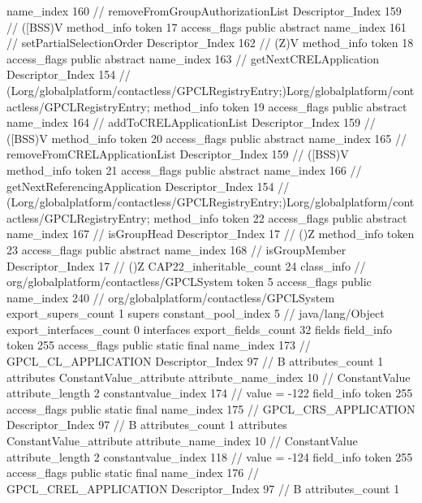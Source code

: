 {{{{{					name_index	160		// removeFromGroupAuthorizationList
					Descriptor_Index	159		// ([BSS)V
				}
				method_info {
					token	17
					access_flags	public abstract
					name_index	161		// setPartialSelectionOrder
					Descriptor_Index	162		// (Z)V
				}
				method_info {
					token	18
					access_flags	public abstract
					name_index	163		// getNextCRELApplication
					Descriptor_Index	154		// (Lorg/globalplatform/contactless/GPCLRegistryEntry;)Lorg/globalplatform/contactless/GPCLRegistryEntry;
				}
				method_info {
					token	19
					access_flags	public abstract
					name_index	164		// addToCRELApplicationList
					Descriptor_Index	159		// ([BSS)V
				}
				method_info {
					token	20
					access_flags	public abstract
					name_index	165		// removeFromCRELApplicationList
					Descriptor_Index	159		// ([BSS)V
				}
				method_info {
					token	21
					access_flags	public abstract
					name_index	166		// getNextReferencingApplication
					Descriptor_Index	154		// (Lorg/globalplatform/contactless/GPCLRegistryEntry;)Lorg/globalplatform/contactless/GPCLRegistryEntry;
				}
				method_info {
					token	22
					access_flags	public abstract
					name_index	167		// isGroupHead
					Descriptor_Index	17		// ()Z
				}
				method_info {
					token	23
					access_flags	public abstract
					name_index	168		// isGroupMember
					Descriptor_Index	17		// ()Z
				}
			}
			CAP22_inheritable_count	24
		}
		class_info {		// org/globalplatform/contactless/GPCLSystem
			token	5
			access_flags	public
			name_index	240		// org/globalplatform/contactless/GPCLSystem
			export_supers_count	1
			supers {
				constant_pool_index	5		// java/lang/Object
			}
			export_interfaces_count	0
			interfaces {
			}
			export_fields_count	32
			fields {
			field_info {
				token	255
				access_flags	public static final
				name_index	173		// GPCL_CL_APPLICATION
				Descriptor_Index	97		// B
				attributes_count	1
				attributes {
				ConstantValue_attribute {
					attribute_name_index	10		// ConstantValue
					attribute_length	2
					constantvalue_index	174		// value = -122
				}
				}
			}
			field_info {
				token	255
				access_flags	public static final
				name_index	175		// GPCL_CRS_APPLICATION
				Descriptor_Index	97		// B
				attributes_count	1
				attributes {
				ConstantValue_attribute {
					attribute_name_index	10		// ConstantValue
					attribute_length	2
					constantvalue_index	118		// value = -124
				}
				}
			}
			field_info {
				token	255
				access_flags	public static final
				name_index	176		// GPCL_CREL_APPLICATION
				Descriptor_Index	97		// B
				attributes_count	1
}}}}}
